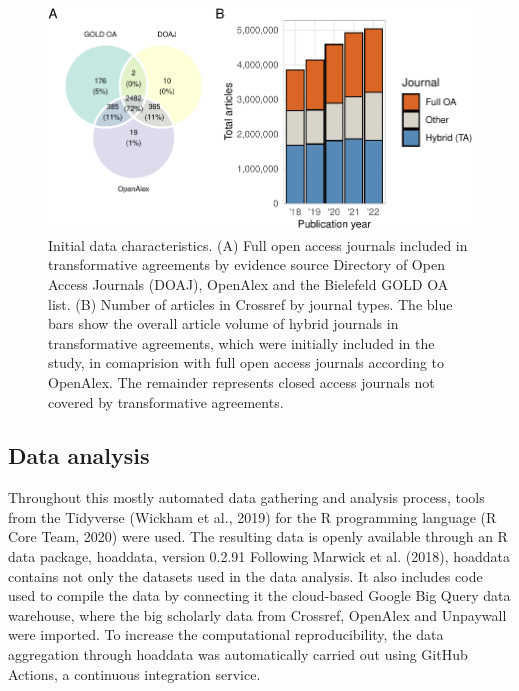 \documentclass[a4paper,man,floatsintext,longtable,noextraspace,12pt]{apa6}
\begin{document}
\begin{figure}[ht!]

{\centering \includegraphics[width=0.99\linewidth,]{fig/method_fig-1} 

}

\caption{Initial data characteristics. (A) Full open access journals included in transformative agreements by evidence source Directory of Open Access Journals (DOAJ), OpenAlex and the Bielefeld GOLD OA list. (B) Number of articles in Crossref by journal types. The blue bars show the overall article volume of hybrid journals in transformative agreements, which were initially included in the study, in comaprision with full open access journals according to OpenAlex. The remainder represents closed access journals not covered by transformative agreements.}\label{fig:method_fig}
\end{figure}

\hypertarget{data-analysis}{%
\subsection{Data analysis}\label{data-analysis}}

Throughout this mostly automated data gathering and analysis process,
tools from the Tidyverse (Wickham et al., 2019) for the R programming
language (R Core Team, 2020) were used. The resulting data is openly
available through an R data package, hoaddata, version 0.2.91 Following
Marwick et al. (2018), hoaddata contains not only the datasets used in
the data analysis. It also includes code used to compile the data by
connecting it the cloud-based Google Big Query data warehouse, where the
big scholarly data from Crossref, OpenAlex and Unpaywall were imported.
To increase the computational reproducibility, the data aggregation
through hoaddata was automatically carried out using GitHub Actions, a
continuous integration service.
\end{document}
